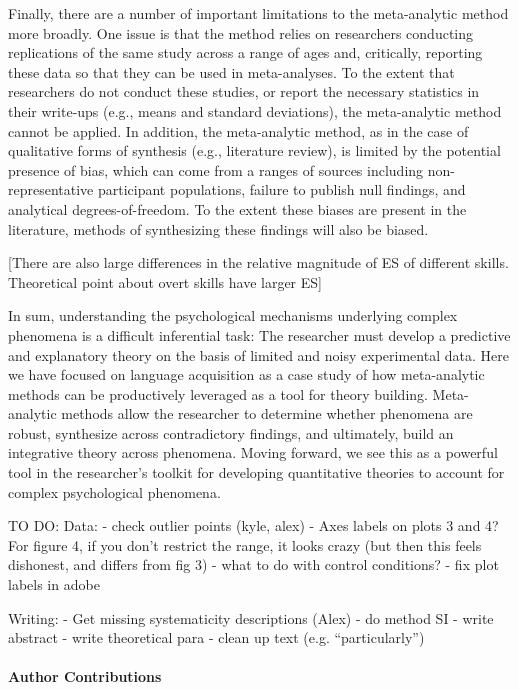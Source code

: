 \documentclass[english,floatsintext,man]{apa6}
\newcounter{author}
\begin{document}
Finally, there are a number of important limitations to the
meta-analytic method more broadly. One issue is that the method relies
on researchers conducting replications of the same study across a range
of ages and, critically, reporting these data so that they can be used
in meta-analyses. To the extent that researchers do not conduct these
studies, or report the necessary statistics in their write-ups (e.g.,
means and standard deviations), the meta-analytic method cannot be
applied. In addition, the meta-analytic method, as in the case of
qualitative forms of synthesis (e.g., literature review), is limited by
the potential presence of bias, which can come from a ranges of sources
including non-representative participant populations, failure to publish
null findings, and analytical degrees-of-freedom. To the extent these
biases are present in the literature, methods of synthesizing these
findings will also be biased.

{[}There are also large differences in the relative magnitude of ES of
different skills. Theoretical point about overt skills have larger ES{]}

In sum, understanding the psychological mechanisms underlying complex
phenomena is a difficult inferential task: The researcher must develop a
predictive and explanatory theory on the basis of limited and noisy
experimental data. Here we have focused on language acquisition as a
case study of how meta-analytic methods can be productively leveraged as
a tool for theory building. Meta-analytic methods allow the researcher
to determine whether phenomena are robust, synthesize across
contradictory findings, and ultimately, build an integrative theory
across phenomena. Moving forward, we see this as a powerful tool in the
researcher's toolkit for developing quantitative theories to account for
complex psychological phenomena.

TO DO: Data: - check outlier points (kyle, alex) - Axes labels on plots
3 and 4? For figure 4, if you don't restrict the range, it looks crazy
(but then this feels dishonest, and differs from fig 3) - what to do
with control conditions? - fix plot labels in adobe

Writing: - Get missing systematicity descriptions (Alex) - do method SI
- write abstract - write theoretical para - clean up text (e.g.
\enquote{particularly})

\paragraph{Author Contributions}\label{author-contributions}
\end{document}
